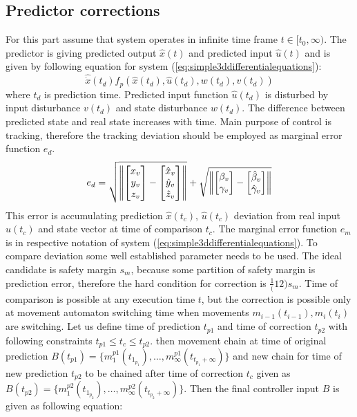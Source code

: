 \subsection{Predictor corrections}
\noindent For this part assume that system operates in infinite time frame $t\in[t_0,\infty)$. The predictor is giving predicted output $\hat{x}(t)$ and predicted input $\hat{u}(t)$ and is given by following equation for system 
(\ref{eq:simple3ddifferentialequations}):
\begin{equation}
    \hat{\dot{x}}(t_d) f_p(\hat{x}(t_d),\hat{u}(t_d),w(t_d),v(t_d))
\end{equation}
\noindent where $t_d$ is prediction time. Predicted input function $\hat{u}(t_d)$ is disturbed by input disturbance $v(t_d)$ and state disturbance $w(t_d)$. The difference between predicted state and real state increases with time. Main purpose of control is tracking, therefore the tracking deviation should be employed as marginal error function $e_d$.
\begin{equation}
    e_d = \sqrt{\left\lVert\begin{bmatrix}x_v\\y_v\\z_v\end{bmatrix} -\begin{bmatrix}\hat{x}_v\\\hat{y}_v\\\hat{z}_v\end{bmatrix}\right\rVert} +\sqrt{\left\lVert\begin{bmatrix}\beta_v\\\gamma_v\end{bmatrix}-\begin{bmatrix}\hat{\beta}_v\\\hat{\gamma}_v\end{bmatrix}\right\rVert}
\end{equation}
\noindent This error is accumulating prediction $\hat{x}(t_c)$, $\hat{u}(t_c)$ deviation from real input $u(t_c)$ and state vector at time of comparison $t_c$. The marginal error function $e_m$ is in respective notation of system (\ref{eq:simple3ddifferentialequations}). To compare deviation some well established parameter needs to be used. The ideal candidate is safety margin $s_m$, because some partition of safety margin is prediction error, therefore the hard condition for correction is $\frac{1}(12)s_m$. Time of comparison is possible at any execution time $t$, but the correction is possible only at movement automaton switching time when movements $m_{i-1}(t_{i-1}),m_i(t_i)$ are switching. Let us define time of prediction $t_{p1}$ and time of correction $t_{p2}$ with following constraints $t_{p1}\le t_c \le t_{p2}$. then movement chain at time of original prediction $B(t_{p1})=\{m_1^{p1}(t_{1_{p_1}}),\dots, m_\infty^{p1}(t_{t_{p_1}+\infty})\}$ and new chain for time of new prediction $t_{p2}$ to be chained after time of correction $t_c$ given as $B(t_{p2})=\{m_1^{p2}(t_{1_{p_2}}),\dots, m_\infty^{p2}(t_{t_{p_2}+\infty})\}$. Then the final controller input $B$ is given as following equation:
